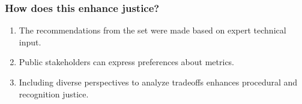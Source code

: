 \begin{frame}
  \frametitle{How does this enhance justice?}
  \begin{enumerate}[<+->]
    \item The recommendations from the \gls{set} were made based on expert
    technical input.
    \item Public stakeholders can express preferences about metrics.
    \item Including diverse perspectives to analyze tradeoffs enhances
    procedural and recognition justice.
  \end{enumerate}  
\end{frame}